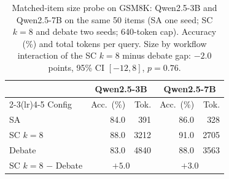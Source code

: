 \begin{table}[t]\centering\small
\caption{Matched-item size probe on GSM8K: Qwen2.5-3B and Qwen2.5-7B on the same 50 items (SA one seed; SC $k{=}8$ and debate two seeds; 640-token cap). Accuracy (\%) and total tokens per query. Size by workflow interaction of the SC $k{=}8$ minus debate gap: $-2.0$ points, 95\% CI $[-12,8]$, $p{=}0.76$.}
\label{tab:scale}
\begin{tabular}{lrrrr}
\toprule
& \multicolumn{2}{c}{Qwen2.5-3B} & \multicolumn{2}{c}{Qwen2.5-7B} \\
\cmidrule(lr){2-3}\cmidrule(lr){4-5}
Config & Acc.\ (\%) & Tok. & Acc.\ (\%) & Tok. \\
\midrule
SA & 84.0 & 391 & 86.0 & 328 \\
SC $k{=}8$ & 88.0 & 3212 & 91.0 & 2705 \\
Debate & 83.0 & 4840 & 88.0 & 3563 \\
\midrule
SC $k{=}8$ $-$ Debate & \multicolumn{2}{c}{$+5.0$} & \multicolumn{2}{c}{$+3.0$} \\
\bottomrule
\end{tabular}
\end{table}
